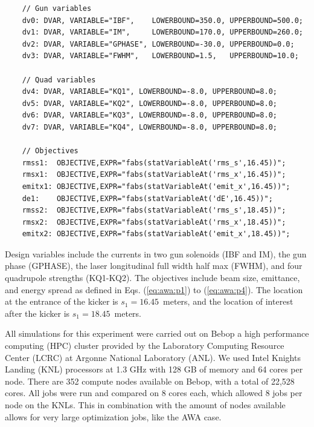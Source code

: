 \vspace{0.2cm}
{\footnotesize \begin{verbatim}
	// Gun variables
	dv0: DVAR, VARIABLE="IBF",    LOWERBOUND=350.0, UPPERBOUND=500.0;
	dv1: DVAR, VARIABLE="IM",     LOWERBOUND=170.0, UPPERBOUND=260.0;
	dv2: DVAR, VARIABLE="GPHASE", LOWERBOUND=-30.0, UPPERBOUND=0.0;
	dv3: DVAR, VARIABLE="FWHM",   LOWERBOUND=1.5,   UPPERBOUND=10.0;
	
	// Quad variables
	dv4: DVAR, VARIABLE="KQ1", LOWERBOUND=-8.0, UPPERBOUND=8.0;
	dv5: DVAR, VARIABLE="KQ2", LOWERBOUND=-8.0, UPPERBOUND=8.0;
	dv6: DVAR, VARIABLE="KQ3", LOWERBOUND=-8.0, UPPERBOUND=8.0;
	dv7: DVAR, VARIABLE="KQ4", LOWERBOUND=-8.0, UPPERBOUND=8.0;
	
	// Objectives
	rmss1:  OBJECTIVE,EXPR="fabs(statVariableAt('rms_s',16.45))";
	rmsx1:  OBJECTIVE,EXPR="fabs(statVariableAt('rms_x',16.45))";
	emitx1: OBJECTIVE,EXPR="fabs(statVariableAt('emit_x',16.45))";
	de1:    OBJECTIVE,EXPR="fabs(statVariableAt('dE',16.45))";	
	rmss2:  OBJECTIVE,EXPR="fabs(statVariableAt('rms_s',18.45))";
	rmsx2:  OBJECTIVE,EXPR="fabs(statVariableAt('rms_x',18.45))";
	emitx2: OBJECTIVE,EXPR="fabs(statVariableAt('emit_x',18.45))";

	\end{verbatim}}
\vspace{0.2cm}

Design variables include the currents in two gun solenoids (IBF and IM), 
the gun phase (GPHASE), the laser longitudinal full width half max (FWHM), 
and four quadrupole strengths (KQ1-KQ2). The objectives include
beam size, emittance, and energy spread as
defined in Eqs. (\ref{eq:awa:p1}) to (\ref{eq:awa:p4}). 
The location at the entrance of the kicker is $s_1=16.45$~meters, 
and the location of interest after the kicker is $s_1=18.45$~meters. 

All simulations for this experiment were carried out on Bebop a
high performance computing (HPC)
cluster provided by the Laboratory Computing Resource Center (LCRC)
at Argonne National Laboratory (ANL). We used Intel Knights Landing 
(KNL) processors at 1.3 GHz with 128 GB of memory 
and 64 cores per node. There are 352 compute nodes available on 
Bebop, with a total of 22,528 cores. All jobs were run and compared 
on 8 cores each, which allowed 8 jobs per node on the KNLs.
This in combination with the amount of nodes available 
allows for very large optimization jobs, like the AWA case.

